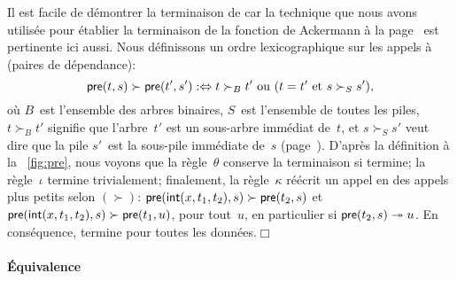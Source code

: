 Il est facile de démontrer la terminaison de
 car la technique que nous avons
utilisée pour établier la terminaison de la fonction de Ackermann à la
page~\pageref{par:ackermann} est pertinente ici aussi. Nous
définissons un ordre lexicographique sur les appels à 
(paires de dépendance):
\begin{equation}
\textsf{pre}(t,s) \succ \textsf{pre}(t',s') :\Leftrightarrow \text{\(t
  \succ_{B} t'\) ou (\(t = t'\) et \(s \succ_{S} s'\))},
\label{eq_BS_order}
\end{equation}
où \(B\)~est l'ensemble des arbres binaires, \(S\)~est l'ensemble de
toutes les piles, \(t \succ_{B} t'\) signifie que l'arbre~\(t'\) est
un sous-arbre immédiat
de~\(t\), et \(s \succ_{S} s'\) veut dire que la pile \(s'\)~est la
sous-pile immédiate
de~\(s\) (page~\pageref{par:well-founded}). D'après la définition à la
\fig~\vref{fig:pre}, nous voyons que la règle~\(\theta\) conserve la
terminaison si  termine; la
règle~\(\iota\) termine trivialement; finalement, la règle~\(\kappa\)
réécrit un appel en des appels plus petits selon \((\succ)\):
\(\textsf{pre}(\textsf{int}(x,t_1,t_2),s) \succ \textsf{pre}(t_2,s)\) et
\(\textsf{pre}(\textsf{int}(x,t_1,t_2),s) \succ \textsf{pre}(t_1,u)\), pour
tout~\(u\), en particulier si \(\textsf{pre}(t_2,s) \twoheadrightarrow
u\). En conséquence,  termine pour
toutes les données.\hfill\(\Box\)

\paragraph{Équivalence}

